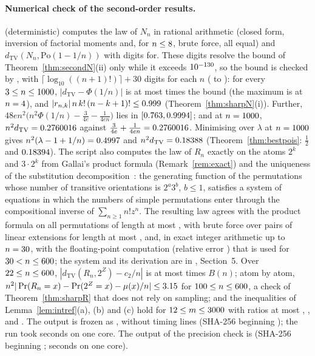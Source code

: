\documentclass[11pt,a4paper]{article}
\theoremstyle{plain}
\theoremstyle{definition}
\theoremstyle{remark}
\begin{document}
\paragraph{Numerical check of the second-order results.}
 (deterministic) computes the law of $N_n$ in rational arithmetic (closed form, inversion of factorial moments and, for $n\le8$, brute force, all equal) and $d_{\mathrm{TV}}(N_n,\mathrm{Po}(1-1/n))$ with \SecDigits{} digits for\SecNrange. These digits resolve the bound of Theorem~\ref{thm:secondN}(ii) only while it exceeds $10^{-130}$, so the bound is checked by , with $\lceil\log_{10}((n+1)!)\rceil+30$ digits for each $n$ (\SecPrecDigitsLo{} to \SecPrecDigitsHi): for every $3\le n\le1000$, $|d_{\mathrm{TV}}-\Phi(1/n)|$ is at most \SecPrecRatio{} times the bound (the maximum is at $n=4$), and $|r_{n,k}|\,n\,k!\,(n-k+1)!\le0.999$ (Theorem~\ref{thm:sharpN}(i)). Further, $48en^2\bigl(n^2\Phi(1/n)-\frac3{4e}-\frac1{4en}\bigr)$ lies in $[0.763,0.9994]$; and at $n=1000$, $n^2d_{\mathrm{TV}}=0.2760016$ against $\frac3{4e}+\frac1{4en}=0.2760016$. Minimising over $\lambda$ at $n=1000$ gives $n^2(\lambda-1+1/n)=0.4997$ and $n^2d_{\mathrm{TV}}=0.18388$ (Theorem~\ref{thm:bestpois}: $\tfrac12$ and $0.18394$). The script also computes the law of $R_n$ exactly on the atoms $2^k$ and $3\cdot2^k$ from Gallai's product formula (Remark~\ref{rem:exact}) and the uniqueness of the substitution decomposition~\citep{albert2005}: the generating function of the permutations whose number of transitive orientations is $2^a3^b$, $b\le1$, satisfies a system of equations in which the numbers of simple permutations enter through the compositional inverse of $\sum_{n\ge1}n!z^n$. The resulting law agrees with the product formula on all permutations of length at most \SecGallaiN, with brute force over pairs of linear extensions for length at most \SecBruteN, and, in exact integer arithmetic up to $n=30$, with the floating-point computation (relative error \SecFloatErr) that is used for $30<n\le600$; the system and its derivation are in , Section~5. Over $22\le n\le600$, $|d_{\mathrm{TV}}(R_n,2^Z)-c_2/n|$ is at most \SecRatioB{} times $B(n)$; atom by atom, $n^2|\Pr(R_n=x)-\Pr(2^Z=x)-\mu(x)/n|\le3.15$ for $100\le n\le600$, a check of Theorem~\ref{thm:sharpR} that does not rely on sampling; and the inequalities of Lemma~\ref{lem:intref}(a), (b) and (c) hold for $12\le m\le3000$ with ratios at most \SecIntrefA, \SecIntrefP, \SecIntrefS{} and \SecIntrefH. The output is frozen as , without timing lines (SHA-256 beginning \texttt{\SecSha}); the run took \SecSeconds{} seconds on one core. The output of the precision check is  (SHA-256 beginning \texttt{\SecPrecSha}; \SecPrecSeconds{} seconds on one core).
\fi



\end{document}
